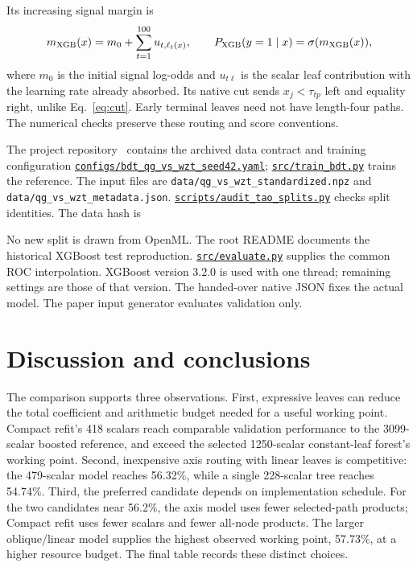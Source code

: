 \documentclass[11pt,a4paper]{article}
\newcommand{\code}[1]{{\small\texttt{\nolinkurl{#1}}}}
\newcommand{\file}[1]{\href{https://github.com/HephyAnalysisSW/oblique-tree-benchmark/blob/main/#1}{\nolinkurl{#1}}}
\begin{document}
Its increasing signal margin is
\begin{equation}
 m_{\rm XGB}(x)=m_0+\sum_{t=1}^{100}u_{t,\ell_t(x)},\qquad
 P_{\rm XGB}(y=1\mid x)=\sigma(m_{\rm XGB}(x)),
 \label{eq:xgb-margin}
\end{equation}
where $m_0$ is the initial signal log-odds and $u_{t\ell}$ is the scalar leaf
contribution with the learning rate already absorbed. Its native cut sends
$x_j<\tau_{tp}$ left and equality right, unlike Eq.~\eqref{eq:cut}.
Early terminal leaves need not have length-four paths. The numerical checks
preserve these routing and score conventions.


\begin{implementation}
The project repository~\cite{benchmark} contains the archived data contract and
training configuration \file{configs/bdt_qg_vs_wzt_seed42.yaml};
\file{src/train_bdt.py} trains the reference. The input files are
\code{data/qg_vs_wzt_standardized.npz} and \code{data/qg_vs_wzt_metadata.json}.
\file{scripts/audit_tao_splits.py} checks split identities. The data hash is
\begin{center}\scriptsize\ttfamily\DatasetHash\end{center}
No new split is drawn from OpenML. The root README documents the historical
XGBoost test reproduction. \file{src/evaluate.py} supplies the common ROC
interpolation. XGBoost version 3.2.0 is used with one thread; remaining settings
are those of that version. The handed-over native JSON fixes the actual model.
The paper input generator evaluates validation only.
\end{implementation}


\FloatBarrier
\section{Discussion and conclusions}
\label{sec:discussion}
The comparison supports three observations. First, expressive leaves can
reduce the total coefficient and arithmetic budget needed for a useful
working point. Compact refit's 418 scalars reach comparable validation
performance to the 3099-scalar boosted reference, and exceed the selected
1250-scalar constant-leaf forest's working point. Second, inexpensive axis
routing with linear leaves is competitive: the 479-scalar model reaches
56.32\%, while a single 228-scalar tree reaches 54.74\%. Third, the preferred
candidate depends on implementation schedule. For the two candidates near 56.2\%, the axis model uses fewer selected-path
products; Compact refit uses fewer scalars and fewer all-node products. The larger
oblique/linear model supplies the highest observed working point, 57.73\%,
at a higher resource budget. The final table records these distinct choices.
\end{document}

